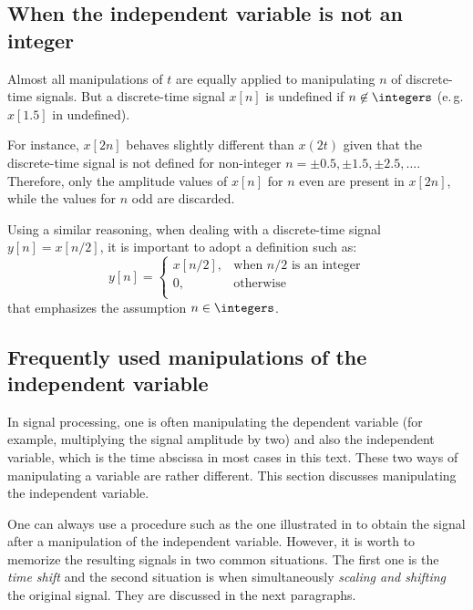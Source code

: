 \subsection{When the independent variable is not an integer}

Almost all manipulations of $t$ are equally applied to manipulating $n$ of discrete-time signals. 
But a discrete-time signal $x[n]$ is undefined if $n \not\in \integers$ (e.\,g. $x[1.5]$ in undefined). 

For instance, $x[2n]$ behaves slightly different than $x(2t)$ given that the discrete-time signal is not defined for non-integer $n=\pm 0.5, \pm 1.5, \pm 2.5, \ldots$. Therefore, only the amplitude values of $x[n]$ for $n$ even are present in $x[2n]$, while the values for $n$ odd are discarded.

Using a similar reasoning, when dealing with a discrete-time signal $y[n]=x[n/2]$, it is important to adopt a definition such as:
\begin{equation}
y[n] = \begin{cases} x[n/2], & \text{when~} n/2 \text{ is an integer} \\ 0, & \text{otherwise} \\ \end{cases}
\end{equation}
that emphasizes the assumption $n \in \integers$.

\subsection{Frequently used manipulations of the independent variable}

In signal processing, one is often manipulating the dependent variable (for example, multiplying the signal amplitude by two) and also the independent variable, which is the time abscissa in most cases in this text. These two ways of manipulating a variable are rather different. This section discusses manipulating the independent variable.

One can always use a procedure such as the one illustrated in  to obtain the signal after a manipulation of the independent variable. However, it is worth to memorize the resulting signals in two common situations. The first one is the \emph{time shift} and the second situation is when simultaneously \emph{scaling and shifting} the original signal. They are discussed in the next paragraphs.

